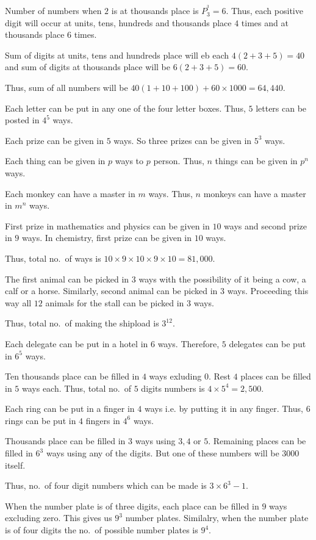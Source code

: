   Number of numbers when $2$ is at thousands place is $P_3^^3 = 6$. Thus, each positive digit will
  occur at units, tens, hundreds and thousands place $4$ times and at thousands place $6$ times.

  Sum of digits at units, tens and hundreds place will eb each $4(2 + 3 + 5) = 40$ and sum of digits at
  thousands place will be $6(2 + 3 + 5) = 60$.

  Thus, sum of all numbers will be $40(1 + 10 + 100) + 60\times1000 = 64,440$.
\item Each letter can be put in any one of the four letter boxes. Thus, $5$ letters can be posted in $4^5$
  ways.
\item Each prize can be given in $5$ ways. So three prizes can be given in $5^3$ ways.
\item Each thing can be given in $p$ ways to $p$ person. Thus, $n$ things can be given in $p^n$ ways.
\item Each monkey can have a master in $m$ ways. Thus, $n$ monkeys can have a master in $m^n$ ways.
\item First prize in mathematics and physics can be given in $10$ ways and second prize in $9$ ways. In
  chemistry, first prize can be given in $10$ ways.

  Thus, total no.\ of ways is $10\times9\times10\times9\times10 = 81,000$.
\item The first animal can be picked in $3$ ways with the possibility of it being a cow, a calf or a
  horse. Similarly, second animal can be picked in $3$ ways. Proceeding this way all $12$ animals for the
  stall can be picked in $3$ ways.

  Thus, total no.\ of making the shipload is $3^{12}$.
\item Each delegate can be put in a hotel in $6$ ways. Therefore, $5$ delegates can be put in $6^5$ ways.
\item Ten thousands place can be filled in $4$ ways exluding $0$. Rest $4$ places can be filled in $5$ ways
  each. Thus, total no.\ of $5$ digits numbers is $4\times5^4 = 2,500$.
\item Each ring can be put in a finger in $4$ ways i.e. by putting it in any finger. Thus, $6$ rings can be
  put in $4$ fingers in $4^6$ ways.
\item Thousands place can be filled in $3$ ways using $3, 4$ or $5$. Remaining places can be filled in $6^3$
  ways using any of the digits. But one of these numbers will be $3000$ itself.

  Thus, no.\ of four digit numbers which can be made is $3\times6^3 - 1$.
\item When the number plate is of three digits, each place can be filled in $9$ ways excluding zero. This
  gives us $9^3$ number plates. Similalry, when the number plate is of four digits the no.\ of possible
  number plates is $9^4$.

